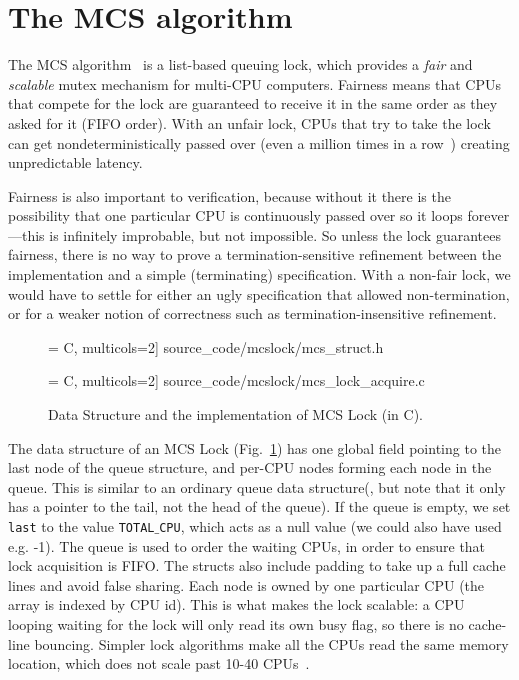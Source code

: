 \section{The MCS algorithm}
\label{sec:overview}

The MCS algorithm~\cite{mcs91} is a list-based queuing lock, which
provides a \emph{fair} and \emph{scalable} mutex mechanism for
multi-CPU computers. Fairness means that
CPUs that compete for the lock are guaranteed to receive it in the same
order as they asked for it (FIFO order). With an unfair lock, CPUs
that try to take the lock can get nondeterministically passed over
(even a million times in a row~\cite{lwn:ticketlocks}) creating
unpredictable latency.

Fairness is also important to verification, because without it
there is the possibility that one particular CPU is continuously
passed over so it loops forever---this is
infinitely improbable, but not impossible.  So unless the lock
guarantees fairness, there is no way to prove a termination-sensitive
refinement between the implementation and a simple (terminating)
specification. With a non-fair lock, we would have to settle for
either an ugly specification that allowed non-termination, or for a
weaker notion of correctness such as termination-insensitive
refinement.

\begin{figure}
\begin{minipage}{\linewidth}
 = C, multicols=2] {source_code/mcslock/mcs_struct.h}
\end{minipage}
 = C, multicols=2] {source_code/mcslock/mcs_lock_acquire.c}
\caption{Data Structure and the implementation of MCS Lock (in C).}
\label{fig:exp:mcs_lock}
\end{figure}

The data structure of an MCS Lock (Fig.~\ref{fig:exp:mcs_lock}) has
one global field pointing to the last node of the queue structure, and
per-CPU nodes forming each node in the queue. This is similar to an
ordinary queue data structure(, but note that it only has a
pointer to the tail, not the head of the queue).  If the queue is
empty, we set \texttt{last} to the value \texttt{TOTAL$\_$CPU}, which
acts as a null value (we could also have used e.g. -1). The queue is
used to order the waiting CPUs, in order to ensure that lock
acquisition is FIFO. The structs also include padding to take up a
full cache lines and avoid false sharing.  Each node is owned by one
particular CPU (the array is indexed by CPU id).  This is what makes
the lock scalable: a CPU looping waiting for the lock will only read
its own busy flag, so there is no cache-line bouncing. Simpler lock
algorithms make all the CPUs read the same memory location, which does
not scale past 10-40 CPUs~\cite{silasnonscale}.

